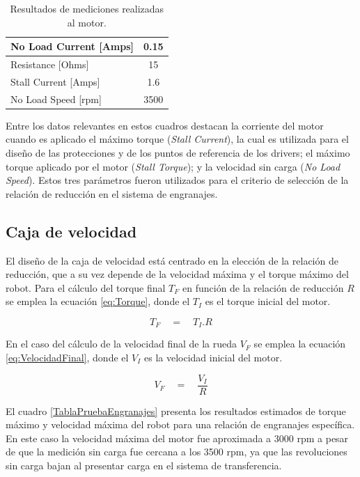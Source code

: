 \begin{table}[htbp]
	\caption{Resultados de mediciones realizadas al motor.}
	\centering
	\begin{tabular}{|l|c|}
		\hline
		No Load Current [Amps] & 0.15 \\ \hline
		Resistance [Ohms] & 15 \\ \hline
		Stall Current [Amps] & 1.6 \\ \hline
		No Load Speed [rpm] & 3500 \\ \hline
	\end{tabular}
	\label{MabuchiResultados}
\end{table}


Entre los datos relevantes en estos cuadros destacan la corriente del motor cuando es aplicado el máximo torque (\textit{Stall Current}), la cual es utilizada para el diseño de las protecciones y de los puntos de referencia de los drivers; el máximo torque aplicado por el motor (\textit{Stall Torque});  y  la velocidad sin carga (\textit{No Load Speed}). Estos tres parámetros fueron  utilizados para el criterio de selección de la relación de reducción en el sistema de engranajes.

\subsection{Caja de velocidad}


El diseño de la caja de velocidad está centrado en la elección de la relación de reducción, que a su vez depende de la velocidad máxima y el torque máximo del robot. Para el cálculo del torque final ${ T }_{ F }$ en función de la relación de reducción $R$ se emplea la ecuación \ref{eq:Torque}, donde el ${ T }_{ I }$ es el torque inicial del motor.


\begin{equation}
\label{eq:Torque}
{ T }_{ F }\quad =\quad { T }_{ I }.R
\end{equation}


En el caso del cálculo de la velocidad final de la rueda ${ V }_{ F }$ se emplea la ecuación \ref{eq:VelocidadFinal}, donde el ${ V }_{ I }$ es la velocidad inicial del motor.

\begin{equation}
\label{eq:VelocidadFinal}
{ V }_{ F }\quad =\quad \frac { { V }_{ I } }{ R } 
\end{equation}


El cuadro \ref{TablaPruebaEngranajes} presenta los resultados estimados  de torque máximo y velocidad máxima del robot para una relación de engranajes específica. En este caso la velocidad máxima del motor fue aproximada a 3000 rpm a pesar de que la medición sin carga fue cercana a los 3500 rpm, ya que las revoluciones sin carga bajan al presentar carga en el sistema de transferencia.

